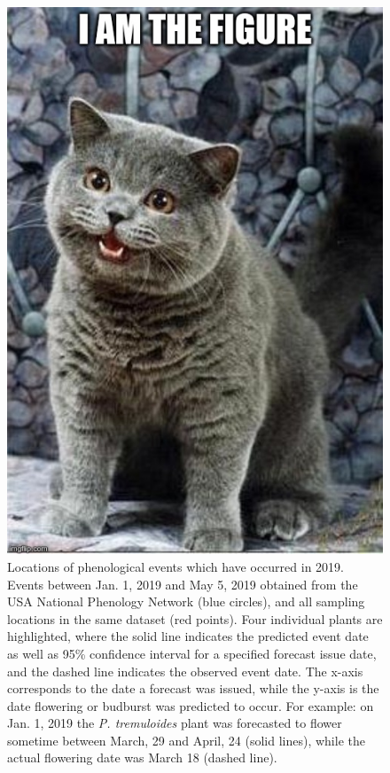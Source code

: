 \begin{figure}
	\centering
		\includegraphics[scale=0.3]{images/figure_filler.jpg}
	\caption[Locations of phenological events which have occurred in 2019]{Locations of phenological events which have occurred in 2019. Events between Jan. 1, 2019 and May 5, 2019 obtained from the USA National Phenology Network (blue circles), and all sampling locations in the same dataset (red points). Four individual plants are highlighted, where the solid line indicates the predicted event date as well as 95\% confidence interval for a specified forecast issue date, and the dashed line indicates the observed event date. The x-axis corresponds to the date a forecast was issued, while the y-axis is the date flowering or budburst was predicted to occur. For example: on Jan. 1, 2019 the \textit{P. tremuloides} plant was forecasted to flower sometime between March, 29 and April, 24 (solid lines), while the actual flowering date was March 18 (dashed line).} \label{fig-4-3}
\end{figure}


